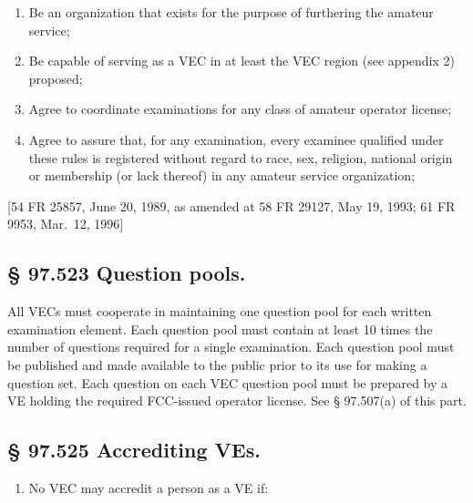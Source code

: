 \documentclass[
  letterpaper,
  DIV=11,
  numbers=noendperiod]{scrreport}
\providecommand{\tightlist}{%
  \setlength{\itemsep}{0pt}\setlength{\parskip}{0pt}}\usepackage{longtable,booktabs,array}
\begin{document}
\begin{enumerate}
\def\labelenumi{(\alph{enumi})}
\item
  Be an organization that exists for the purpose of furthering the
  amateur service;
\item
  Be capable of serving as a VEC in at least the VEC region (see
  appendix 2) proposed;
\item
  Agree to coordinate examinations for any class of amateur operator
  license;
\item
  Agree to assure that, for any examination, every examinee qualified
  under these rules is registered without regard to race, sex, religion,
  national origin or membership (or lack thereof) in any amateur service
  organization;
\end{enumerate}

{[}54 FR 25857, June 20, 1989, as amended at 58 FR 29127, May 19, 1993;
61 FR 9953, Mar.~12, 1996{]}

\hypertarget{question-pools.}{%
\subsection*{§ 97.523 Question pools.}\label{question-pools.}}

All VECs must cooperate in maintaining one question pool for each
written examination element. Each question pool must contain at least 10
times the number of questions required for a single examination. Each
question pool must be published and made available to the public prior
to its use for making a question set. Each question on each VEC question
pool must be prepared by a VE holding the required FCC-issued operator
license. See § 97.507(a) of this part.

\hypertarget{accrediting-ves.}{%
\subsection*{§ 97.525 Accrediting VEs.}\label{accrediting-ves.}}

\begin{enumerate}
\def\labelenumi{(\alph{enumi})}
\tightlist
\item
  No VEC may accredit a person as a VE if:
\end{enumerate}
\end{document}
